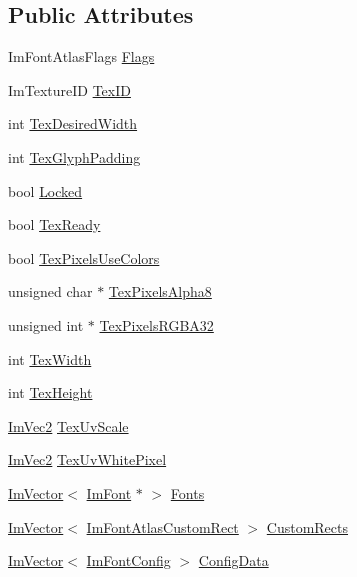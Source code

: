 \subsection*{Public Attributes}
\begin{DoxyCompactItemize}
\item 
Im\+Font\+Atlas\+Flags \hyperlink{structImFontAtlas_adf2f2d04b46911ad01cfbef0f59e1f11}{Flags}
\item 
Im\+Texture\+ID \hyperlink{structImFontAtlas_a1d7be9a6190c75706f80bda16c87f28e}{Tex\+ID}
\item 
int \hyperlink{structImFontAtlas_aa1d62d7da5633f894dbe881547e9de7c}{Tex\+Desired\+Width}
\item 
int \hyperlink{structImFontAtlas_a32034b2aac4616d8c27ee666a1fd1b62}{Tex\+Glyph\+Padding}
\item 
bool \hyperlink{structImFontAtlas_a2222ff64ba974a8ee7a286617f879f9b}{Locked}
\item 
bool \hyperlink{structImFontAtlas_a9d28236e71f9a21a21d8f4f7eac39299}{Tex\+Ready}
\item 
bool \hyperlink{structImFontAtlas_a4bc426a6a9c2fd3ab1ad3893142613ff}{Tex\+Pixels\+Use\+Colors}
\item 
unsigned char $\ast$ \hyperlink{structImFontAtlas_a443ea9e7c4cf85ee791ffe891280eff3}{Tex\+Pixels\+Alpha8}
\item 
unsigned int $\ast$ \hyperlink{structImFontAtlas_a41163489a5b8060f405c56e22590cba5}{Tex\+Pixels\+R\+G\+B\+A32}
\item 
int \hyperlink{structImFontAtlas_a2d0662502433e7a87b3aa4681ba17aa3}{Tex\+Width}
\item 
int \hyperlink{structImFontAtlas_a5ef74d37ec01d9e8aac5c57433296ce3}{Tex\+Height}
\item 
\hyperlink{structImVec2}{Im\+Vec2} \hyperlink{structImFontAtlas_adbe3a6b1fd501108649fe04f882b8664}{Tex\+Uv\+Scale}
\item 
\hyperlink{structImVec2}{Im\+Vec2} \hyperlink{structImFontAtlas_af1d05221e9a1607d7f625df92a4f9b7e}{Tex\+Uv\+White\+Pixel}
\item 
\hyperlink{structImVector}{Im\+Vector}$<$ \hyperlink{structImFont}{Im\+Font} $\ast$ $>$ \hyperlink{structImFontAtlas_a0198aeb17ef8bb810ccc8db103b93b1f}{Fonts}
\item 
\hyperlink{structImVector}{Im\+Vector}$<$ \hyperlink{structImFontAtlasCustomRect}{Im\+Font\+Atlas\+Custom\+Rect} $>$ \hyperlink{structImFontAtlas_ae3752e66f7454a42e5ae5ec052af537c}{Custom\+Rects}
\item 
\hyperlink{structImVector}{Im\+Vector}$<$ \hyperlink{structImFontConfig}{Im\+Font\+Config} $>$ \hyperlink{structImFontAtlas_afa4f7459807763d032fe2d0022fc0823}{Config\+Data}

\end{DoxyCompactItemize}
